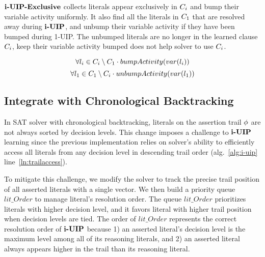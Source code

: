 $\textbf{i-UIP-Exclusive}$ collects literals appear exclusively in $C_{i}$ and bump their variable activity uniformly. It also find all the literals in $C_{1}$ that are resolved away during $\textbf{i-UIP}$, and unbump their variable activity if they have been bumped during 1-UIP. The unbumped literals are no longer in the learned clause $C_{i}$, keep their variable activity bumped does not help solver to use $C_{i}$.

\[ \forall l_{i} \in  C_{i} \setminus C_{1} \cdot bumpActivity(var(l_{i})) 
\]
\[ \forall l_{1} \in  C_{1} \setminus C_{i} \cdot unbumpActivity(var(l_{1})) 
\]


\subsection{Integrate with Chronological Backtracking}
In SAT solver with chronological backtracking, literals on the assertion trail $\phi$ are not always sorted by decision levels. This change imposes a challenge to $\textbf{i-UIP}$ learning since the previous implementation relies on solver's ability to efficiently access all literals from any decision level in descending trail order (alg.~\ref{alg:i-uip} line~\ref{ln:trailaccess}). 

To mitigate this challenge, we modify the solver to track the precise trail position of all asserted literals with a single vector. We then build a priority queue $lit\_Order$ to manage literal's resolution order. The queue $lit\_Order$  prioritizes literals with higher decision level, and it favors literal with higher trail position when decision levels are tied. The order of $lit\_Order$  represents the correct resolution order of $\textbf{i-UIP}$ because 1) an asserted literal's decision level is the maximum level among all of its reasoning literals, and 2) an asserted literal always appears higher in the trail than its reasoning literal.  

